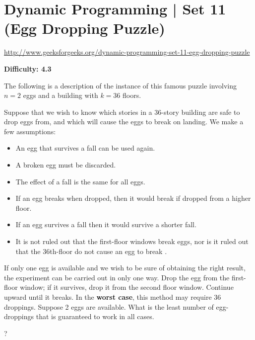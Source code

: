 
\section{Dynamic Programming | Set 11 (Egg Dropping Puzzle)
  \label{secGFGDPSet11EggDropPuzz}}

\url{http://www.geeksforgeeks.org/dynamic-programming-set-11-egg-dropping-puzzle}

\textbf{Difficulty: 4.3}

The following is a description of the instance of this famous puzzle
involving $n=2$ eggs and a building with $k=36$ floors.

Suppose that we wish to know which stories in a 36-story building are safe
to drop eggs from, and which will cause the eggs to break on landing. We
make a few assumptions:
\begin{itemize}[noitemsep,topsep=0pt]
\item An egg that survives a fall can be used again.
\item A broken egg must be discarded.
\item The effect of a fall is the same for all eggs.
\item If an egg breaks when dropped, then it would break if dropped from a
  higher floor.
\item If an egg survives a fall then it would survive a shorter fall.
\item It is not ruled out that the first-floor windows break eggs, nor is it
  ruled out that the $36$th-floor do not cause an egg to break .
\end{itemize}
If only one egg is available and we wish to be sure of obtaining the right
result, the experiment can be carried out in only one way. Drop the egg from
the first-floor window; if it survives, drop it from the second floor
window. Continue upward until it breaks. In the \textbf{worst case}, this
method may require $36$ droppings. Suppose 2 eggs are available. What is the
least number of egg-droppings that is guaranteed to work in all cases.

?

